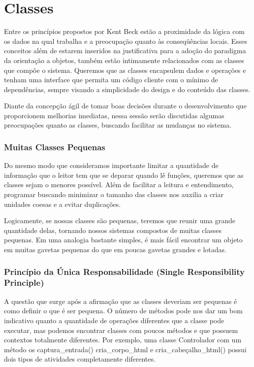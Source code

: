 \section{Classes}
\label{sec:classes}

	Entre os princípios propostos por Kent Beck estão a proximidade da lógica com os dados na qual trabalha e a preocupação quanto às conseqüências locais. Esses conceitos além de estarem inseridos na justificativa para a adoção do paradigma da orientação a objetos, também estão intimamente relacionados com as classes que compõe o sistema. Queremos que as classes encapsulem dados e operações e tenham uma interface que permita um código cliente com o mínimo de dependências, sempre visando a simplicidade do design e do conteúdo das classes.
	
	Diante da concepção ágil de tomar boas decisões durante o desenvolvimento que proporcionem melhorias imediatas, nessa sessão serão discutidas algumas preocupações quanto as classes, buscando facilitar as mudanças no sistema.

\subsubsection{Muitas Classes Pequenas}
	Do mesmo modo que consideramos importante limitar a quantidade de informação que o leitor tem que se deparar quando lê funções, queremos que as classes sejam o menores possível. Além de facilitar a leitura e entendimento, programar buscando minimizar o tamanho das classes nos auxilia a criar unidades coesas e a evitar duplicações. 
	
	Logicamente, se nossas classes são pequenas, teremos que reunir uma grande quantidade delas, tornando nossos sistemas compostos de muitas classes pequenas. Em uma analogia bastante simples, é mais fácil encontrar um objeto em muitas gavetas pequenas do que em poucas gavetas grandes e lotadas.

\subsubsection{Princípio da Única Responsabilidade (Single Responsibility Principle)}
	A questão que surge após a afirmação que as classes deveriam ser pequenas é como definir o que é ser pequena. O número de métodos pode nos dar um bom indicativo quanto a quantidade de operações diferentes que a classe pode executar, mas podemos encontrar classes com poucos métodos e que possuem contextos totalmente diferentes. Por exemplo, uma classe Controlador com um método os captura_entrada() cria_corpo_html e cria_cabeçalho_html() possui dois tipos de atividades completamente diferentes.
	
